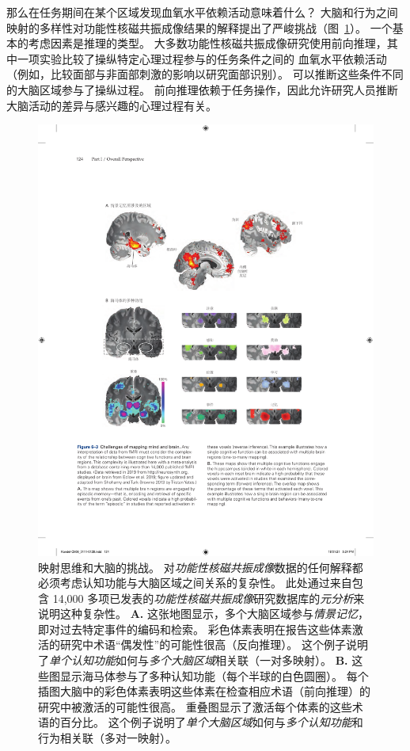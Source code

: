 那么在任务期间在某个区域发现血氧水平依赖活动意味着什么？
大脑和行为之间映射的多样性对功能性核磁共振成像结果的解释提出了严峻挑战（图~\ref{fig:6_3}）。
一个基本的考虑因素是推理的类型。 
大多数功能性核磁共振成像研究使用前向推理，其中一项实验比较了操纵特定心理过程参与的任务条件之间的 血氧水平依赖活动（例如，比较面部与非面部刺激的影响以研究面部识别）。
可以推断这些条件不同的大脑区域参与了操纵过程。
前向推理依赖于任务操作，因此允许研究人员推断大脑活动的差异与感兴趣的心理过程有关。


\begin{figure}[htbp]
	\centering
	\includegraphics[width=1.0\linewidth]{chap06/fig_6_3}
	\caption{映射思维和大脑的挑战。
		对\textit{功能性核磁共振成像}数据的任何解释都必须考虑认知功能与大脑区域之间关系的复杂性。
		此处通过来自包含 14,000 多项已发表的\textit{功能性核磁共振成像}研究数据库的\textit{元分析}来说明这种复杂性。
		\textbf{A.} 这张地图显示，多个大脑区域参与\textit{情景记忆}，即对过去特定事件的编码和检索。
		彩色体素表明在报告这些体素激活的研究中术语“偶发性”的可能性很高（反向推理）。
		这个例子说明了\textit{单个认知功能}如何与\textit{多个大脑区域}相关联（一对多映射）。
		\textbf{B.} 这些图显示海马体参与了多种认知功能（每个半球的白色圆圈）。 
		每个插图大脑中的彩色体素表明这些体素在检查相应术语（前向推理）的研究中被激活的可能性很高。
		重叠图显示了激活每个体素的这些术语的百分比。
		这个例子说明了\textit{单个大脑区域}如何与\textit{多个认知功能}和行为相关联（多对一映射）。}
	\label{fig:6_3}
\end{figure}


